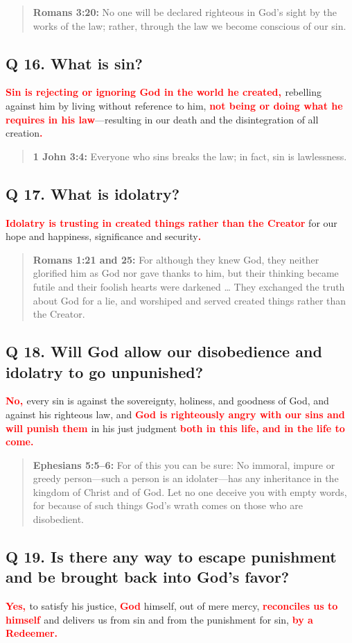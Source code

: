 \documentclass[titlepage]{memoir}
\newcommand\Children[1]{\textbf{\textcolor{red}{#1}}}
\newcommand\Quote[2]{\begin{quote}{\small\textbf{#1:}{ #2}}\end{quote}}
\begin{document}
\Quote{Romans 3:20}{No one will be declared righteous in God's sight by the works of the law; rather, through the law we become conscious of our sin.}

\subsection{Q 16. What is sin?}
\Children{Sin is rejecting or ignoring God in the world he created, }rebelling against him by living without reference to him, \Children{not being or doing what he requires in his law}\thinspace{}---\thinspace{}resulting in our death and the disintegration of all creation\Children{.}

\Quote{1 John 3:4}{Everyone who sins breaks the law; in fact, sin is lawlessness.}

\subsection{Q 17. What is idolatry?}
\Children{Idolatry is trusting in created things rather than the Creator} for our hope and happiness, significance and security\Children{.}

\Quote{Romans 1:21 and 25\index[rom]{01:25@1:25}}{For although they knew God, they neither glorified him as God nor gave thanks to him, but their thinking became futile and their foolish hearts were darkened {\dots} They exchanged the truth about God for a lie, and worshiped and served created things rather than the Creator.}

\subsection{Q 18. Will God allow our disobedience and idolatry to go unpunished?}
\Children{No, }every sin is against the sovereignty, holiness, and goodness of God, and against his righteous law, and \Children{God is righteously angry with our sins and will punish them }in his just judgment \Children{both in this life, and in the life to come.}

\Quote{Ephesians 5:5--6}{For of this you can be sure: No immoral, impure or greedy person\thinspace{}---\thinspace{}such a person is an idolater\thinspace{}---\thinspace{}has any inheritance in the kingdom of Christ and of God. Let no one deceive you with empty words, for because of such things God's wrath comes on those who are disobedient.}

\subsection{Q 19. Is there any way to escape punishment and be brought back into God's favor?}
\Children{Yes, }to satisfy his justice, \Children{God} himself, out of mere mercy, \Children{reconciles us to himself }and delivers us from sin and from the punishment for sin, \Children{by a Redeemer.}
\end{document}

